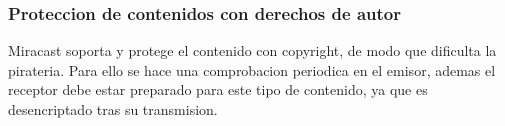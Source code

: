 \begin{frame}
  \frametitle{Proteccion de contenidos con derechos de autor}
  Miracast soporta y protege el contenido con copyright, de modo que dificulta la pirateria. Para ello se hace una comprobacion periodica en el emisor, ademas el receptor debe estar preparado para este tipo de contenido, ya que es desencriptado tras su transmision.
\end{frame}
